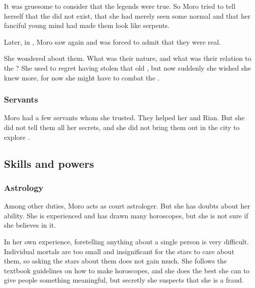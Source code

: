 It was gruesome to consider that the legends were true. 
So Moro tried to tell herself that the \serpentmen did not exist, that she had merely seen some normal \scathae and that her fanciful young mind had made them look like serpents.

Later, in \Malcur, Moro saw \quiljaaran again and was forced to admit that they were real. 

She wondered about them.
What was their nature, and what was their relation to the \taorthae?
She used to regret having stolen that old \arcanum, but now suddenly she wished she knew more, for now she might have to combat the \serpentmen.





\subsubsection{Servants}
Moro had a few servants whom she trusted. 
They helped her and Rian. 
But she did not tell them all her secrets, and she did not bring them out in the city to explore \Malcur.









\subsection{Skills and powers}





\subsubsection{Astrology}
Among other duties, Moro acts as court astrologer. 
But she has doubts about her ability. 
She is experienced and has drawn many horoscopes, but she is not sure if she believes in it. 

In her own experience, foretelling anything about a single person is very difficult. 
Individual mortals are too small and insignificant for the stars to care about them, so asking the stars about them does not gain much. 
She follows the textbook guidelines on how to make horoscopes, and she does the best she can to give people something meaningful, but secretly she suspects that she is a fraud. 





